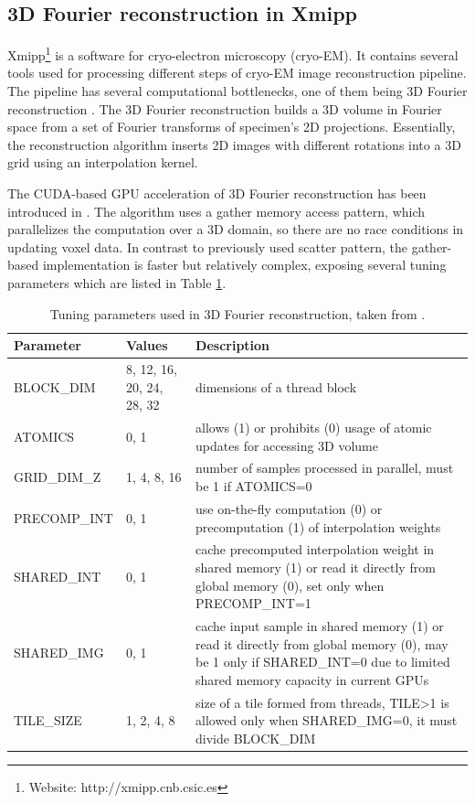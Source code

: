 \documentclass
[
    digital, %
    oneside, %
    table, %
    nolof, %
    nolot, %
    nocover %
]{fithesis3}
\begin{document}
\subsection{3D Fourier reconstruction in Xmipp}
Xmipp\footnote{Website: http://xmipp.cnb.csic.es} is a software for cryo-electron microscopy (cryo-EM). It contains several tools used for processing
different steps of cryo-EM image reconstruction pipeline. The pipeline has several computational bottlenecks, one of them being 3D Fourier reconstruction
\cite{cryoem-source}. The 3D Fourier reconstruction builds a 3D volume in Fourier space from a set of Fourier transforms of specimen's 2D projections.
Essentially, the reconstruction algorithm inserts 2D images with different rotations into a 3D grid using an interpolation kernel.

The CUDA-based GPU acceleration of 3D Fourier reconstruction has been introduced in \cite{cryoem-example}. The algorithm uses a gather memory access
pattern, which parallelizes the computation over a 3D domain, so there are no race conditions in updating voxel data. In contrast to previously used
scatter pattern, the gather-based implementation is faster but relatively complex, exposing several tuning parameters which are listed in Table
\ref{fourier_tuning_parameters}.

\begin{table}
\begin{center}
    \begin{tabular}{|l|p{2cm}|p{7cm}|}
    \hline
    Parameter & Values & Description \\
    \hline
    BLOCK\_DIM & 8, 12, 16, 20, 24, 28, 32 & dimensions of a thread block \\
    ATOMICS & 0, 1 & allows (1) or prohibits (0) usage of atomic updates for accessing 3D volume \\
    GRID\_DIM\_Z & 1, 4, 8, 16 & number of samples processed in parallel, must be 1 if ATOMICS=0 \\
    PRECOMP\_INT & 0, 1 & use on-the-fly computation (0) or precomputation (1) of interpolation weights \\
    SHARED\_INT & 0, 1 & cache precomputed interpolation weight in shared memory (1) or read it directly from global memory (0), set only when PRECOMP\_INT=1 \\
    SHARED\_IMG & 0, 1 & cache input sample in shared memory (1) or read it directly from global memory (0), may be 1 only if SHARED\_INT=0 due to limited shared memory capacity in current GPUs \\
    TILE\_SIZE & 1, 2, 4, 8 & size of a tile formed from threads, TILE\textgreater 1 is allowed only when SHARED\_IMG=0, it must divide BLOCK\_DIM \\
    \hline
    \end{tabular}
\end{center}
\caption{Tuning parameters used in 3D Fourier reconstruction, taken from \cite{cryoem-example}.}
\label{fourier_tuning_parameters}
\end{table}
\end{document}
